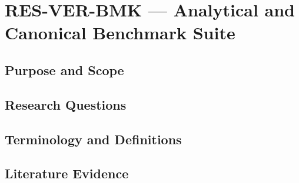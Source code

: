 
\section{RES-VER-BMK --- Analytical and Canonical Benchmark Suite}
\label{sec:res-ver-bmk}

\subsection{Purpose and Scope}
\label{sec:res-ver-bmk-purpose}


\subsection{Research Questions}
\label{sec:res-ver-bmk-research-questions}


\subsection{Terminology and Definitions}
\label{sec:res-ver-bmk-definitions}


\subsection{Literature Evidence}
\label{sec:res-ver-bmk-literature-evidence}

%

